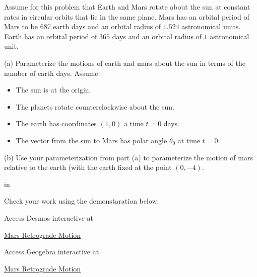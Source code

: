 \documentclass{ximera}
\newcommand{\pskip}{\vskip 0.1 in}
\begin{document}
\begin{exploration}  \label{Eddfsdfd6yhh}
Assume for this problem that Earth and Mars rotate about the sun at constant rates in circular orbits that lie in the same plane. Mars has an orbital period of Mars to be 687 earth days and an orbital radius of $1.524$ astronomical units. Earth has an orbital period of $365$ days and an orbital radius of $1$ astronomical unit.

(a) Parameterize the motions of earth and mars about the sun in terms of the number of earth days. Assume

\begin{itemize}

\item{The sun is at the origin.}

\item{The planets rotate counterclockwise about the sun.}

\item{The earth has coordinates $(1,0)$ a time $t=0$ days.}

\item{The vector from the sun to Mars has polar angle $\theta_0$ at time $t=0$.}

\end{itemize}

(b) Use your parameterization from part (a)  to parameterize the motion of mars relative to the earth (with the earth  fixed at the point $(0,-4)$.

\pskip

Check your work using the demonstaration below.

Access Desmos interactive at
 
\href{https://www.desmos.com/calculator/htc4xgrjxs}{Mars Retrograde Motion}

 
\begin{onlineOnly}
    \begin{center}
\end{center}
\end{onlineOnly}


Access Geogebra interactive at
 
\href{https://www.geogebra.org/classic/addm38j6}{Mars Retrograde Motion}

 
\begin{onlineOnly}
    \begin{center}
\end{center}
\end{onlineOnly}




\end{exploration}
\end{document}
